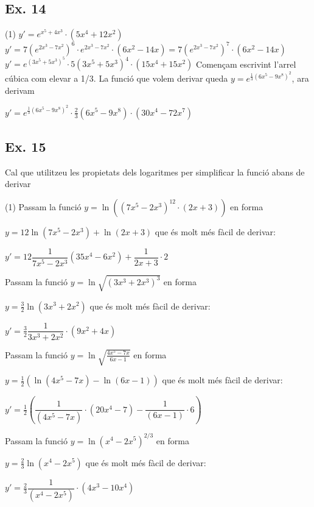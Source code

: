 \documentclass[a4paper, 11pt]{book}
\begin{document}
\subsection*{Ex. 14}

\begin{tasks}(1)
	\task  $y'=e^{x^5+4x^3}\cdot (5x^4+12 x^2 )$
	\task  $y'=7 \left( e^{2x^3-7x^2} \right)^6 \cdot e^{2x^3-7x^2} \cdot (6x^2-14x)=7 \left( e^{2x^3-7x^2} \right)^7   \cdot (6x^2-14x)$
	\task  $y'=e^{(3x^5+5x^3)^5}\cdot 5(3x^5+5x^3)^4\cdot (15 x^4+ 15x^2)$
	\task  Començam escrivint l'arrel cúbica com elevar a 1/3. La funció que volem derivar queda $y=e^{\frac{1}{3}(6x^5-9x^8)^2}$, ara derivam
	
	 $y'=e^{\frac{1}{3}(6x^5-9x^8)^2}\cdot \frac{2}{3}(6x^5-9x^8)\cdot(30x^4 - 72 x^7)$
\end{tasks}	
	
	
\subsection*{Ex. 15}
	Cal que utilitzeu les propietats dels logaritmes per simplificar la funció abans de derivar
	\begin{tasks}(1)
		\task   Passam la funció $y=\ln\left( (7x^5-2x^3)^{12} \cdot (2x+3) \right)$ en forma
	
		$y=12 \ln (7x^5-2x^3) + \ln(2x+3)$ que és molt més fàcil de derivar:
		
		$y'=12 \dfrac{1}{7x^5-2x^3}(35x^4-6x^2)+\dfrac{1}{2x+3}\cdot 2$
		
		
	   \task  Passam  la funció $y=\ln\sqrt{\left( 3x^3+2x^3\right)^3}$ en forma
	   
	   $y=\frac{3}{2}\ln(3x^3+2x^2)$ que és molt més fàcil de derivar:
	   
	   	$y'=\frac{3}{2}\dfrac{1}{3x^3+2x^2}\cdot (9x^2+4x)$
	   
	 
	  \task  Passam la funció $y=\ln\sqrt{\frac{4x^5-7x}{6x-1}}$ en forma
	 
	 $y=\frac{1}{2}\left( \ln(4x^5-7x) - \ln(6x-1)\right)$ que és molt més fàcil de derivar:
	 
	 $y'=\frac{1}{2}\left( \dfrac{1}{(4x^5-7x)}\cdot(20 x^4 - 7) - \dfrac{1}{(6x-1)}\cdot 6\right)$
	 
	 	  \task  Passam   la funció $y=\ln \left( x^4-2x^5 \right)^{2/3}$ en forma
	 
	 $y=\frac{2}{3} \ln (x^4-2x^5)$ que és molt més fàcil de derivar:
	 
	 $y'=\frac{2}{3}  \dfrac{1}{(x^4-2x^5)}\cdot(4 x^3 - 10x^4) $
	\end{tasks}	
\end{document}
